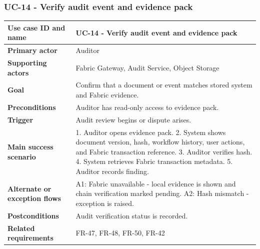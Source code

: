 \documentclass[11pt,a4paper]{article}
\begin{document}
\subsubsection{UC-14 - Verify audit event and evidence pack}
\begin{footnotesize}
\begin{longtable}{@{}p{}p{}@{}}
\rowcolor{gray!10}\textbf{Use case ID and name} & UC-14 - Verify audit event and evidence pack \\ \hline
\rowcolor{gray!10}\textbf{Primary actor} & Auditor \\ \hline
\rowcolor{gray!10}\textbf{Supporting actors} & Fabric Gateway, Audit Service, Object Storage \\ \hline
\rowcolor{gray!10}\textbf{Goal} & Confirm that a document or event matches stored system and Fabric evidence. \\ \hline
\rowcolor{gray!10}\textbf{Preconditions} & Auditor has read-only access to evidence pack. \\ \hline
\rowcolor{gray!10}\textbf{Trigger} & Audit review begins or dispute arises. \\ \hline
\rowcolor{gray!10}\textbf{Main success scenario} & 1. Auditor opens evidence pack. 2. System shows document version, hash, workflow history, user actions, and Fabric transaction reference. 3. Auditor verifies hash. 4. System retrieves Fabric transaction metadata. 5. Auditor records finding. \\ \hline
\rowcolor{gray!10}\textbf{Alternate or exception flows} & A1: Fabric unavailable - local evidence is shown and chain verification marked pending. A2: Hash mismatch - exception is raised. \\ \hline
\rowcolor{gray!10}\textbf{Postconditions} & Audit verification status is recorded. \\ \hline
\rowcolor{gray!10}\textbf{Related requirements} & FR-47, FR-48, FR-50, FR-42 \\ \hline
\end{longtable}
\end{footnotesize}
\end{document}
